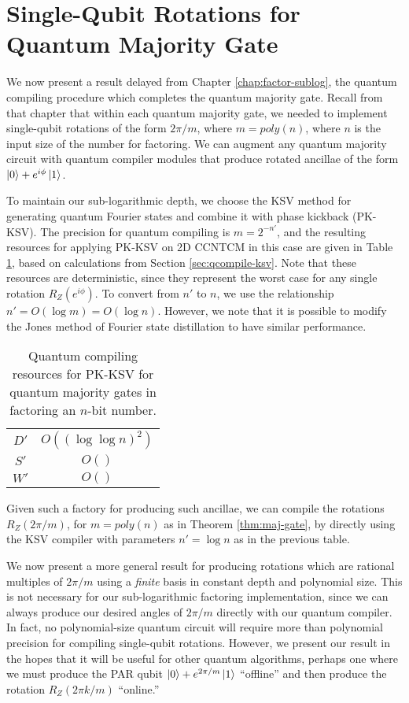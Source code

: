 \section{Single-Qubit Rotations for Quantum Majority Gate}
\label{sec:qcompile-maj}

We now present a result delayed from Chapter \ref{chap:factor-sublog},
the quantum compiling procedure which completes the quantum majority gate.
Recall from that chapter that within each quantum majority gate, we
needed to implement single-qubit rotations of the form
$2\pi / m$, where $m = poly(n)$, where $n$ is the input size of the
number for factoring. We can augment any quantum
majority circuit with quantum compiler modules that produce
rotated ancillae of the form $\left\vert{0}\right\rangle + e^{i\phi}\left\vert{1}\right\rangle$.

To maintain our sub-logarithmic depth, we choose the KSV method for
generating quantum Fourier states and combine it with phase kickback
(PK-KSV).
The precision for quantum compiling is $m = 2^{-n'}$, and the
resulting resources for applying PK-KSV on \textsf{2D CCNTCM}
in this case are
given in Table \ref{tab:pk-ksv-resources}, based on calculations
from Section \ref{sec:qcompile-ksv}. Note that these resources
are deterministic, since they represent the worst case for any
single rotation $R_Z(e^{i\phi})$. To convert from $n'$ to $n$,
we use the relationship $n' = O(\log m) = O(\log n)$.
However, we note that it is possible to modify the Jones method of
Fourier state distillation to have similar performance.

\begin{table}[hbt!]
\begin{tabular}{|c|c|}
\hline
$D'$ & $O((\log \log n)^2)$ \\
$S'$ & $O()$ \\
$W'$ & $O()$ \\
\hline
\end{tabular}
\caption{Quantum compiling resources for PK-KSV for quantum majority gates
in factoring an $n$-bit number.}
\label{tab:pk-ksv-resources}
\end{table}

Given such a factory for producing such ancillae, we can compile the
rotations $R_Z(2\pi / m)$, for $m = poly(n)$ as in Theorem \ref{thm:maj-gate},
by directly using the KSV compiler with parameters $n' = \log n$ as in the
previous table.

We now present a more general result for
producing rotations which are rational multiples of $2\pi / m$ 
using a \emph{finite}
basis in constant depth and polynomial size.
This is not necessary for our sub-logarithmic factoring implementation,
since we can always produce our desired angles of $2\pi / m$ directly
with our quantum compiler.
In fact, no polynomial-size quantum circuit will require more than
polynomial precision for compiling single-qubit rotations. However, we
present our result in the hopes that it will be useful for other
quantum algorithms, perhaps one where we must produce the
PAR qubit $\left\vert{0}\right\rangle + e^{2\pi / m}\left\vert{1}\right\rangle$ ``offline'' and then produce
the rotation $R_Z(2\pi k / m)$ ``online.''

